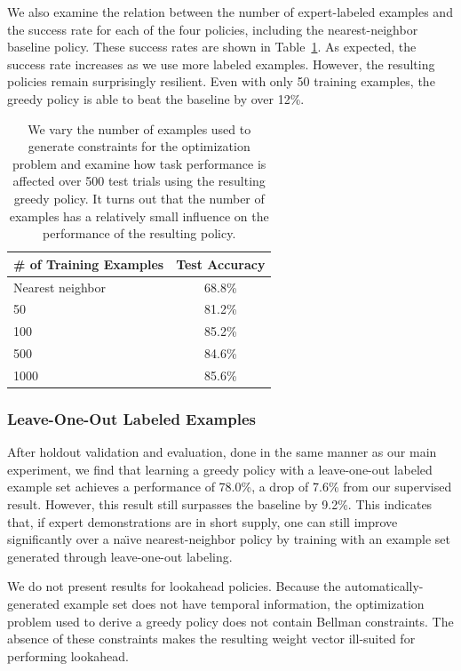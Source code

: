 We also examine the relation between the number of expert-labeled examples and
the success rate for each of the four policies, including the nearest-neighbor
baseline policy.  These success rates are shown in
Table~\ref{table:number_examples}.  As expected, the success rate increases as
we use more labeled examples. However, the resulting policies remain
surprisingly resilient. Even with only 50 training examples, the greedy policy is able to beat the baseline by over 12\%.

\begin{table}
  \centering
  \begin{tabular}{lc}
    \toprule
      \# of Training Examples & Test Accuracy\\
    \midrule
      Nearest neighbor \cite{Schulmanetal_ISRR2013} & 68.8\% \\
    \midrule
      50 & 81.2\% \\
      100 & 85.2\% \\
      500 & 84.6\% \\
      1000 & 85.6\%
    \bottomrule
  \end{tabular}
  \caption{We vary the number of examples used to generate constraints for the
    \mmql{} optimization problem and examine how task performance is affected
    over 500 test trials using the resulting greedy policy. It turns out that
    the number of examples has a relatively small influence on the performance
    of the resulting policy.}
  \label{table:number_examples}
\end{table}

\subsubsection{Leave-One-Out Labeled Examples}

After holdout validation and evaluation, done in the same manner as our main
experiment, we find that learning a greedy policy with a leave-one-out labeled
example set achieves a performance of 78.0\%, a drop of 7.6\% from our
supervised result. However, this result still surpasses the baseline by
9.2\%. This indicates that, if expert demonstrations are in short supply, one
can still improve significantly over a na\"{\i}ve nearest-neighbor policy by
training with an example set generated through leave-one-out labeling.

We do not present results for lookahead policies. Because the
automatically-generated example set does not have temporal information, the
optimization problem used to derive a greedy policy does not contain Bellman
constraints. The absence of these constraints makes the resulting weight vector
ill-suited for performing lookahead.
